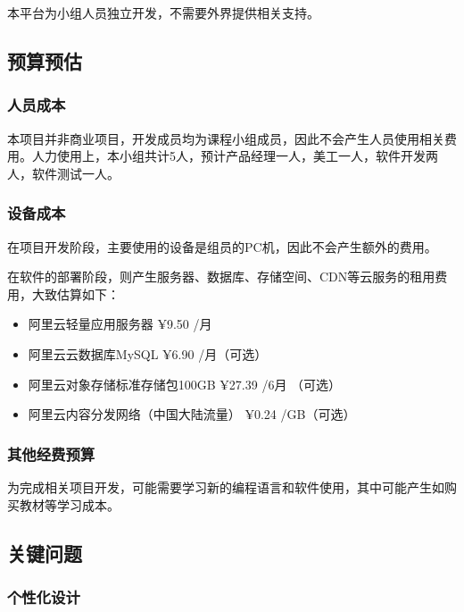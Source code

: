 \documentclass[
]{article}
\begin{document}
本平台为小组人员独立开发，不需要外界提供相关支持。

\hypertarget{header-n602}{%
\subsection{预算预估}\label{header-n602}}

\hypertarget{header-n603}{%
\subsubsection{人员成本}\label{header-n603}}

本项目并非商业项目，开发成员均为课程小组成员，因此不会产生人员使用相关费用。人力使用上，本小组共计5人，预计产品经理一人，美工一人，软件开发两人，软件测试一人。

\hypertarget{header-n605}{%
\subsubsection{设备成本}\label{header-n605}}

在项目开发阶段，主要使用的设备是组员的PC机，因此不会产生额外的费用。

在软件的部署阶段，则产生服务器、数据库、存储空间、CDN等云服务的租用费用，大致估算如下：

\begin{itemize}
\item
  阿里云轻量应用服务器 ¥9.50 /月
\item
  阿里云云数据库MySQL ¥6.90 /月（可选）
\item
  阿里云对象存储标准存储包100GB ¥27.39 /6月 （可选）
\item
  阿里云内容分发网络（中国大陆流量） ¥0.24 /GB（可选）
\end{itemize}

\hypertarget{header-n617}{%
\subsubsection{其他经费预算}\label{header-n617}}

为完成相关项目开发，可能需要学习新的编程语言和软件使用，其中可能产生如购买教材等学习成本。

\hypertarget{header-n619}{%
\subsection{关键问题}\label{header-n619}}

\hypertarget{header-n620}{%
\subsubsection{个性化设计}\label{header-n620}}
\end{document}
